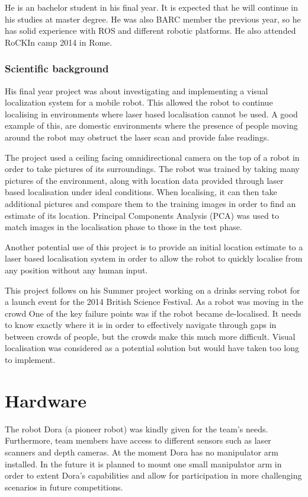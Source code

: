 \documentclass[conference]{IEEEtran}
\begin{document}
He is an bachelor student in his final year. It is expected that he will continue in his studies at master degree. He was also BARC member the previous year, so he has solid experience with ROS and different robotic platforms. He also attended RoCKIn camp 2014 in Rome.

\subsubsection*{Scientific background}
 
His final year project was about investigating and implementing a visual localization system for a mobile robot. This allowed the robot to continue localising in environments where laser based localisation cannot be used. A good example of this, are domestic environments where the presence of people moving around the robot may obstruct the laser scan and provide false readings.
 
The project used a ceiling facing omnidirectional camera on the top of a robot in order to take pictures of its surroundings.
The robot was trained by taking many pictures of the environment, along with location data provided through laser based localisation under ideal conditions. When localising, it can then take additional pictures and compare them to the training images in order to find an estimate of its location. Principal Components Analysis (PCA) was used to match images in the localisation phase to those in the test phase. 

Another potential use of this project is to provide an initial location estimate to a laser based localisation system in order to allow the robot to quickly localise from any position without any human input.

This project follows on his Summer project working on a drinks serving robot for a launch event for the 2014 British Science Festival. As a robot was moving in the crowd One of the key failure points was if the robot became de-localised. It needs to know exactly where it is in order to effectively navigate through gaps in between crowds of people, but the crowds make this much more difficult. Visual localisation was considered as a potential solution but would have taken too long to implement.

\section{\label{sec:hardware}Hardware}
The robot Dora (a pioneer robot) was kindly given for the team's needs. Furthermore, team members have access to different sensors such as laser scanners and depth cameras. At the moment Dora has no manipulator arm installed. In the future it is planned to mount one small manipulator arm in order to extent Dora's capabilities and allow for participation in more challenging scenarios in future competitions.
\end{document}
